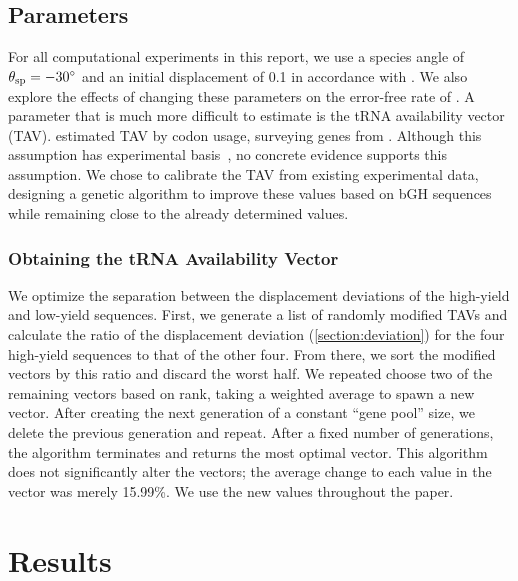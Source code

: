 \documentclass[twocolumn, article, oneside]{memoir}
\begin{document}
\subsection{Parameters}
\label{section:parameters}
For all computational experiments in this report, we use a species
angle of $\theta_{\textrm{sp}} = -30^\circ$ and an initial displacement of 0.1
in accordance with \citet{lalit:mechanics}.
We also explore the effects of changing these parameters on the
error-free rate of \prfB.
A parameter that is much more difficult to estimate
is the tRNA availability vector (TAV).
\citeauthor{lalit:mechanics} estimated TAV by codon usage, 
surveying genes from \ecoli.
Although this assumption has experimental basis~\cite{ikemura}, 
no concrete evidence supports this assumption.
We chose to calibrate the TAV from existing experimental data, 
designing a genetic algorithm to improve these values based on 
bGH sequences while remaining close 
to the already determined values.

\subsubsection{Obtaining the tRNA Availability Vector}
We optimize the separation between the displacement deviations of the 
high-yield and low-yield sequences. First, we generate a list of 
randomly modified TAVs and calculate the ratio of the 
displacement deviation (\autoref{section:deviation}) for the four 
high-yield sequences to that of the other four. From there, we sort the 
modified vectors by this ratio and discard the worst half.
We repeated choose two of the remaining vectors based on rank, taking a weighted 
average to spawn a new vector.  After creating the 
next generation of a constant ``gene pool'' size, we delete 
the previous generation and repeat. After a fixed number of 
generations, the algorithm terminates and returns the most optimal vector.
This algorithm does not significantly alter the vectors; the average 
change to each value in the vector was merely 15.99\%. We use the new values
throughout the paper.

\section{Results}
\subsection{\prfB}
\end{document}

